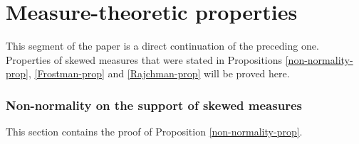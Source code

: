 \documentclass[12pt, twoside]{article}
\theoremstyle{definition}
\numberwithin{equation}{section}
\begin{document}
%
\newpage 
\part{Measure-theoretic properties} \label{Part-nonnorm-F-R}
This segment of the paper is a direct continuation of the preceding one. Properties of skewed measures that were stated in Propositions \ref{non-normality-prop}, \ref{Frostman-prop} and \ref{Rajchman-prop} will be proved here.  

\section{Non-normality on the support of skewed measures} \label{non-normality-section} 
This section contains the proof of Proposition \ref{non-normality-prop}. 
\end{document}
